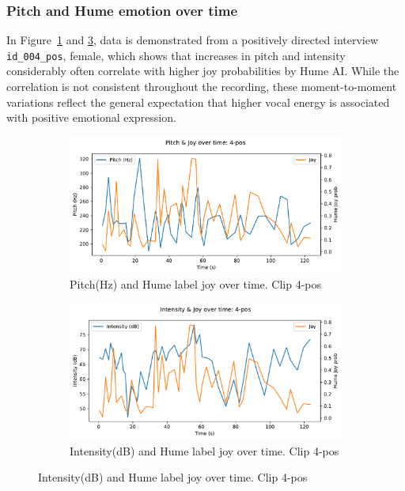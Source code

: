 \subsubsection{Pitch and Hume emotion over time}
In Figure~\ref{fig:pitch-4-pos} and \ref{fig:intensity-4-pos}, data is demonstrated from a positively directed interview \texttt{id\_004\_pos}, female, which shows that increases in pitch and intensity considerably often correlate with higher joy probabilities by Hume AI. While the correlation is not consistent throughout the recording, these moment-to-moment variations reflect the general expectation that higher vocal energy is associated with positive emotional expression. 

\begin{figure}[H]
    \centering
    \begin{subfigure}[b]{0.47\textwidth}
        \includegraphics[width=\linewidth]{png/results/rq1/pitch_joy_4-pos.pdf}
        \caption{Pitch(Hz) and Hume label joy over time. Clip 4-pos}
        \label{fig:pitch-4-pos}
    \end{subfigure}
    \hspace{0.04\textwidth}
    \begin{subfigure}[b]{0.47\textwidth}
        \includegraphics[width=\linewidth]{png/results/rq1/intensity_joy_4-pos.pdf}
        \caption{Intensity(dB) and Hume label joy over time. Clip 4-pos}
        \label{fig:intensity-4-pos}
    \end{subfigure}
\end{figure}

